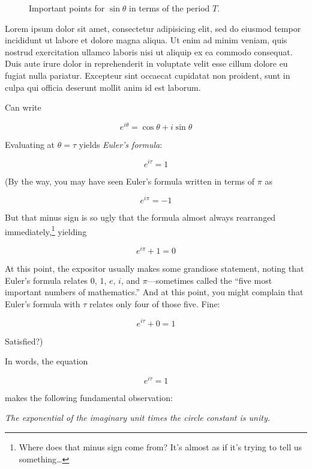 \documentclass{article}
\begin{document}
\begin{figure}
\begin{center}
\end{center}
\caption{Important points for $\sin\theta$ in terms of the period $T$.\label{fig:sine-with-tau}}
\end{figure}

Lorem ipsum dolor sit amet, consectetur adipisicing elit, sed do eiusmod tempor incididunt ut labore et dolore magna aliqua. Ut enim ad minim veniam, quis nostrud exercitation ullamco laboris nisi ut aliquip ex ea commodo consequat. Duis aute irure dolor in reprehenderit in voluptate velit esse cillum dolore eu fugiat nulla pariatur. Excepteur sint occaecat cupidatat non proident, sunt in culpa qui officia deserunt mollit anim id est laborum.
  


Can write

\[ e^{i\theta} = \cos\theta + i\sin\theta \]

Evaluating at $\theta = \tau$ yields \emph{Euler's formula}:

\[ e^{i\tau} = 1 \]

(By the way, you may have seen Euler's formula written in terms of $\pi$ as 


\[ e^{i\pi} = -1 \]

\noindent But that minus sign is so ugly that the formula almost always rearranged immediately,\footnote{Where does that minus sign come from? It's almost as if it's trying to tell us something\ldots} yielding

\[ e^{i\pi} + 1 = 0 \]

\noindent At this point, the expositor usually makes some grandiose statement, noting that Euler's formula relates $0$, $1$, $e$, $i$, and $\pi$---sometimes called the ``five most important numbers of mathematics.'' And at this point, you might complain that Euler's formula with $\tau$ relates only four of those five. Fine:


\[ e^{i\tau} + 0 = 1 \]

Satisfied?)


In words, the equation

\[
  e^{i\tau} = 1
\]

\noindent makes the following fundamental observation: 

\begin{center}
\emph{The exponential of the imaginary unit times the circle constant is unity.} 
\end{center}
\end{document}
